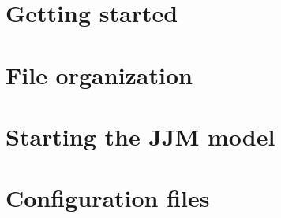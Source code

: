 \documentclass{article}
\begin{document}
\section{Getting started} 

\section{File organization}

\section{Starting the JJM model}

\section{Configuration files}
\end{document}
